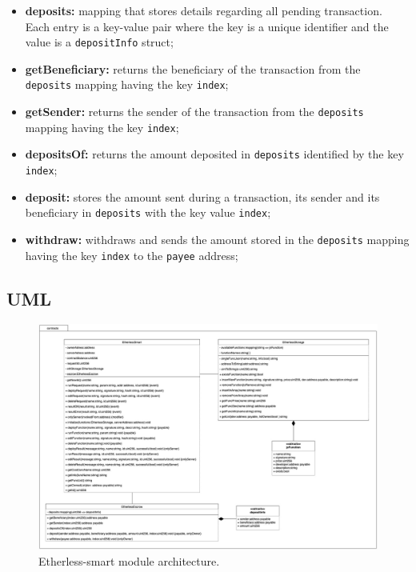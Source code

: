 	\begin{itemize}
		\item \textbf{deposits:} mapping that stores details regarding all pending transaction. Each entry is a key-value pair where the key is a unique identifier and the value is a \texttt{depositInfo} struct;
		\end{itemize}
	\begin{itemize}
		\item \textbf{getBeneficiary:} returns the beneficiary of the transaction from the \texttt{deposits} mapping having the key \texttt{index};
		\item \textbf{getSender:} returns the sender of the transaction from the \texttt{deposits} mapping having the key \texttt{index};
		\item \textbf{depositsOf:} returns the amount deposited in \texttt{deposits} identified by the key \texttt{index};
		\item \textbf{deposit:} stores the amount sent during a transaction, its sender and its beneficiary in \texttt{deposits} with the key value \texttt{index};
		\item \textbf{withdraw:} withdraws and sends the amount stored in the \texttt{deposits} mapping having the key \texttt{index} to the \texttt{payee} address;
	\end{itemize}

	\begin{landscape}
	\subsection{UML}
		\begin{figure}[H]
			\includegraphics[width=21cm]{./diagrammi/etherless-smart/Etherless-smart.jpg}
			\caption{Etherless-smart module architecture.}
		\end{figure}
	\end{landscape}
	\restoregeometry

